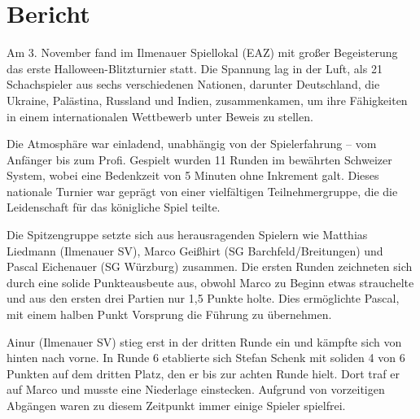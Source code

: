 \documentclass[a4paper,ngerman]{tui-algo-seminar}
\title{\content}
\author{Erik Skopp}
\begin{document}
	
	\maketitle
\thispagestyle{plain} %

\begin{abstract}
Das erste Halloween-Blitzturnier im Ilmenauer Spiellokal (EAZ) am 3. November versammelte 21 Schachspieler aus sechs Nationen, darunter Deutschland, die Ukraine, Palästina, Russland und Indien. Gespielt wurden 11 Runden im Schweizer System mit einer Bedenkzeit von 5 Minuten. Marco Geißhirt und Pascal Eichenauer lieferten sich ein spannendes Duell, das Marco durch den Buchholzunterschied für sich entschied. Das Turnier, das von einer vielfältigen Teilnehmergruppe geprägt war, erfreute sich nicht nur sportlichen Erfolgs, sondern auch gesellschaftlicher Anerkennung. Ein weiteres Blitzturnier zum Nikolaus ist bereits in Planung.
\end{abstract}

\section{Bericht}

Am 3. November fand im Ilmenauer Spiellokal (EAZ) mit großer Begeisterung das erste Halloween-Blitzturnier statt. Die Spannung lag in der Luft, als 21 Schachspieler aus sechs verschiedenen Nationen, darunter Deutschland, die Ukraine, Palästina, Russland und Indien, zusammenkamen, um ihre Fähigkeiten in einem internationalen Wettbewerb unter Beweis zu stellen.

Die Atmosphäre war einladend, unabhängig von der Spielerfahrung – vom Anfänger bis zum Profi. Gespielt wurden 11 Runden im bewährten Schweizer System, wobei eine Bedenkzeit von 5 Minuten ohne Inkrement galt. Dieses nationale Turnier war geprägt von einer vielfältigen Teilnehmergruppe, die die Leidenschaft für das königliche Spiel teilte.

Die Spitzengruppe setzte sich aus herausragenden Spielern wie Matthias Liedmann (Ilmenauer SV), Marco Geißhirt (SG Barchfeld/Breitungen) und Pascal Eichenauer (SG Würzburg) zusammen. Die ersten Runden zeichneten sich durch eine solide Punkteausbeute aus, obwohl Marco zu Beginn etwas strauchelte und aus den ersten drei Partien nur 1,5 Punkte holte. Dies ermöglichte Pascal, mit einem halben Punkt Vorsprung die Führung zu übernehmen.

Ainur (Ilmenauer SV) stieg erst in der dritten Runde ein und kämpfte sich von hinten nach vorne. In Runde 6 etablierte sich Stefan Schenk mit soliden 4 von 6 Punkten auf dem dritten Platz, den er bis zur achten Runde hielt. Dort traf er auf Marco und musste eine Niederlage einstecken. Aufgrund von vorzeitigen Abgängen waren zu diesem Zeitpunkt immer einige Spieler spielfrei.
\end{document}
